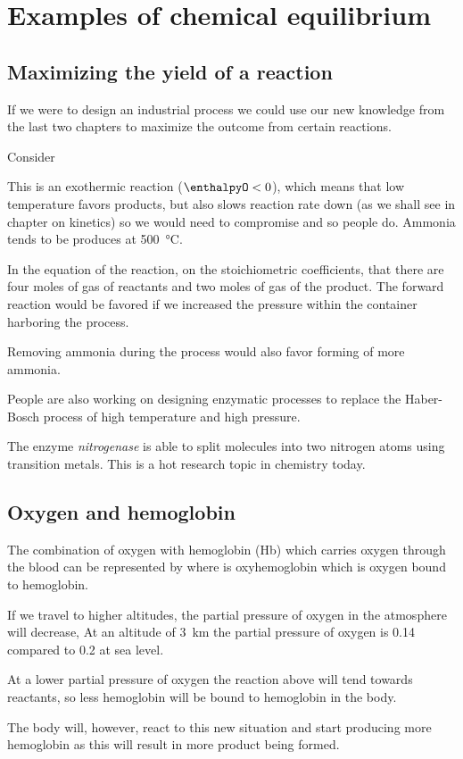 \documentclass[../mit-general-chemistry.tex]{subfiles}
\begin{document}
\section{Examples of chemical equilibrium}






\subsection{Maximizing the yield of a reaction}


If we were to design an industrial process we could use our new
knowledge from the last two chapters to maximize the outcome from
certain reactions.

Consider

This is an exothermic reaction ($\enthalpyO < 0$), which means that
low temperature favors products, but also slows reaction rate down (as
we shall see in chapter on kinetics) so we would need to compromise
and so people do. Ammonia tends to be produces at \SI{500}{\celsius}.

In the equation of the reaction, on the stoichiometric coefficients,
that there are four moles of gas of reactants and two moles of gas of
the product. The forward reaction would be favored if we increased the
pressure within the container harboring the process.

Removing ammonia during the process would also favor forming of more
ammonia.


People are also working on designing enzymatic processes to replace
the Haber-Bosch process of high temperature and high pressure.

The enzyme {\em nitrogenase} is able to split  molecules into
two nitrogen atoms using transition metals. This is a hot research
topic in chemistry today.




\subsection{Oxygen and hemoglobin}


The combination of oxygen with hemoglobin (Hb) which carries oxygen
through the blood can be represented by
where  is oxyhemoglobin which is oxygen bound to hemoglobin.

If we travel to higher altitudes, the partial pressure of oxygen in
the atmosphere will decrease, At an altitude of \SI{3}{\kilo\meter}
the partial pressure of oxygen is \SI{0.14}{\atm} compared to
\SI{0.2}{\atm} at sea level.

At a lower partial pressure of oxygen the reaction above will tend
towards reactants, so less hemoglobin will be bound to hemoglobin in
the body.

The body will, however, react to this new situation and start
producing more hemoglobin as this will result in more product being
formed.
\end{document}
